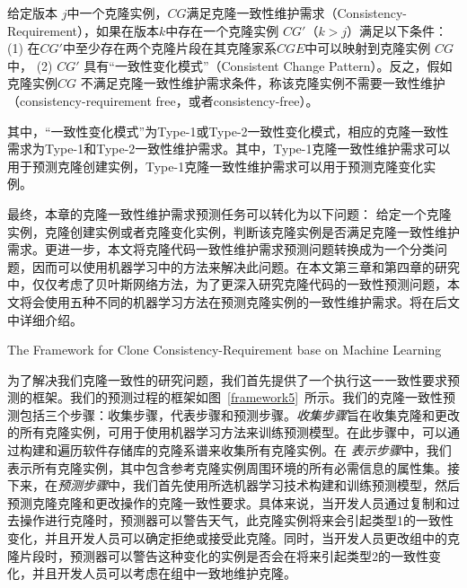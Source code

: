\begin{definition} 
 \label{def-consistency}
给定版本 $j$中一个克隆实例，$CG$满足克隆一致性维护需求（Consistency-Requirement），如果在版本$k$中存在一个克隆实例 $CG'$（$k>j$）满足以下条件： (1) 在$CG'$中至少存在两个克隆片段在其克隆家系$CGE$中可以映射到克隆实例 $CG$中， (2) $CG'$ 具有“一致性变化模式”（Consistent Change Pattern）。反之，假如克隆实例$CG$ 不满足克隆一致性维护需求条件，称该克隆实例不需要一致性维护（consistency-requirement free，或者consistency-free）。
\end{definition}


其中，“一致性变化模式”为Type-1或Type-2一致性变化模式，相应的克隆一致性需求为Type-1和Type-2一致性维护需求。其中，Type-1克隆一致性维护需求可以用于预测克隆创建实例，Type-1克隆一致性维护需求可以用于预测克隆变化实例。

最终，本章的克隆一致性维护需求预测任务可以转化为以下问题：
 给定一个克隆实例，克隆创建实例或者克隆变化实例，判断该克隆实例是否满足克隆一致性维护需求。更进一步，本文将克隆代码一致性维护需求预测问题转换成为一个分类问题，因而可以使用机器学习中的方法来解决此问题。在本文第三章和第四章的研究中，仅仅考虑了贝叶斯网络方法，为了更深入研究克隆代码的一致性预测问题，本文将会使用五种不同的机器学习方法在预测克隆实例的一致性维护需求。将在后文中详细介绍。


{The Framework for Clone Consistency-Requirement base on Machine Learning}

为了解决我们克隆一致性的研究问题，我们首先提供了一个执行这一一致性要求预测的框架。我们的预测过程的框架如图~\ref{framework5}~所示。我们的克隆一致性预测包括三个步骤：收集步骤，代表步骤和预测步骤。{\em 收集步骤\/}旨在收集克隆和更改的所有克隆实例，可用于使用机器学习方法来训练预测模型。在此步骤中，可以通过构建和遍历软件存储库的克隆系谱来收集所有克隆实例。在\emph{ 表示步骤\/}中，我们表示所有克隆实例，其中包含参考克隆实例周围环境的所有必需信息的属性集。接下来，在{\em 预测步骤\/}中，我们首先使用所选机器学习技术构建和训练预测模型，然后预测克隆克隆和更改操作的克隆一致性要求。具体来说，当开发人员通过复制和过去操作进行克隆时，预测器可以警告天气，此克隆实例将来会引起类型1的一致性变化，并且开发人员可以确定拒绝或接受此克隆。同时，当开发人员更改组中的克隆片段时，预测器可以警告这种变化的实例是否会在将来引起类型2的一致性变化，并且开发人员可以考虑在组中一致地维护克隆。

